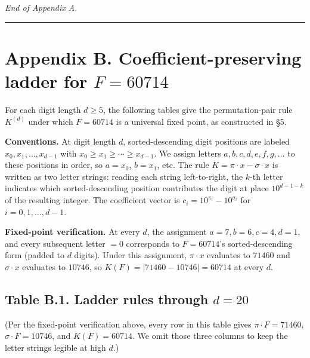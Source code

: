 \documentclass[11pt,letterpaper]{article}
\theoremstyle{paperstyle}
\theoremstyle{paperstyledef}
\theoremstyle{paperstylerem}
\begin{document}
\emph{End of Appendix A.}

\begin{center}\rule{0.5\linewidth}{0.5pt}\end{center}

\hypertarget{appendix-b.-coefficient-preserving-ladder-for-f-60714}{%
\section{\texorpdfstring{Appendix B. Coefficient-preserving ladder for
\(F = 60714\)}{Appendix B. Coefficient-preserving ladder for F = 60714}}\label{appendix-b.-coefficient-preserving-ladder-for-f-60714}}

For each digit length \(d \geq 5\), the following tables give the
permutation-pair rule \(K^{(d)}\) under which \(F = 60714\) is a
universal fixed point, as constructed in §5.

\textbf{Conventions.} At digit length \(d\), sorted-descending digit
positions are labeled \(x_0, x_1, \ldots, x_{d-1}\) with
\(x_0 \geq x_1 \geq \cdots \geq x_{d-1}\). We assign letters
\(a, b, c, d, e, f, g, \ldots\) to these positions in order, so
\(a = x_0\), \(b = x_1\), etc. The rule
\(K = \pi \cdot x - \sigma \cdot x\) is written as two letter strings:
reading each string left-to-right, the \(k\)-th letter indicates which
sorted-descending position contributes the digit at place \(10^{d-1-k}\)
of the resulting integer. The coefficient vector is
\(c_i = 10^{\pi_i} - 10^{\sigma_i}\) for \(i = 0, 1, \ldots, d-1\).

\textbf{Fixed-point verification.} At every \(d\), the assignment
\(a = 7, b = 6, c = 4, d = 1\), and every subsequent letter \(= 0\)
corresponds to \(F = 60714\)'s sorted-descending form (padded to \(d\)
digits). Under this assignment, \(\pi \cdot x\) evaluates to \(71460\)
and \(\sigma \cdot x\) evaluates to \(10746\), so
\(K(F) = |71460 - 10746| = 60714\) at every \(d\).

\hypertarget{table-b.1.-ladder-rules-through-d-20}{%
\subsection{\texorpdfstring{Table B.1. Ladder rules through \(d = 20\)}{Table B.1. Ladder rules through d = 20}}\label{table-b.1.-ladder-rules-through-d-20}}

(Per the fixed-point verification above, every row in this table gives
\(\pi \cdot F = 71460\), \(\sigma \cdot F = 10746\), and
\(K(F) = 60714\). We omit those three columns to keep the letter strings
legible at high \(d\).)
\end{document}
